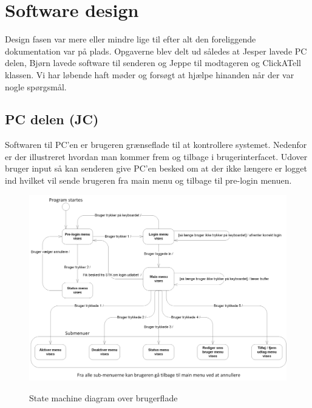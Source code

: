 \clearpage

\section{Software design}

Design fasen var mere eller mindre lige til efter alt den foreliggende dokumentation var på plads. Opgaverne blev delt ud således at Jesper lavede PC delen, Bjørn lavede software til senderen og Jeppe til modtageren og ClickATell klassen. Vi har løbende haft møder og forsøgt at hjælpe hinanden når der var nogle spørgsmål.

\subsection{PC delen (JC)}

Softwaren til PC'en er brugeren grænseflade til at kontrollere systemet. Nedenfor er der illustreret hvordan man kommer frem og tilbage i brugerinterfacet. Udover bruger input så kan senderen give PC'en besked om at der ikke længere er logget ind hvilket vil sende brugeren fra main menu og tilbage til pre-login menuen.

\begin{figure}[htbp] \centering
{\includegraphics[width=\textwidth]{billeder/uml/state_machine_main}}
\caption{State machine diagram over brugerflade}
\label{lab:State machine diagram over brugerflade}
\end{figure}
